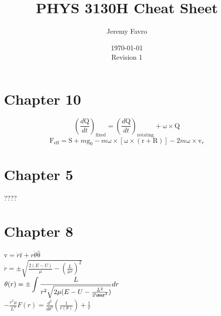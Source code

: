 \documentclass[10pt,landscape,letterpaper]{cheatsheet}
\title{PHYS 3130H Cheat Sheet}
\author{Jeremy Favro}
\date{\today\\Revision 1}
\newcommand{\bv}[1]{\bm{\mathrm{#1}}}
\newcommand{\uv}[1]{\hat{\bv{{#1}}}}
\begin{document}
\maketitle

\section*{Chapter 10}
$$\left(\frac{d\bv{Q}}{dt}\right)_{\mathrm{fixed}}=\left(\frac{d\bv{Q}}{dt}\right)_{\mathrm{rotating}}+\bv{\omega}\times \bv{Q}$$
$$\bv{F}_{\mathrm{eff}}=\bv{S}+m\bv{g}_0-m\bv{\omega}\times\left[\bv{\omega}\times (\bv{r}+\bv{R})\right]-2m\bv{\omega}\times \bv{v}_r$$
\section*{Chapter 5}
???? 
\section*{Chapter 8}
$\bv{v}=\dot{r}\uv{r}+r\dot{\theta}\uv{\theta}$\\
$\dot{r}=\pm\sqrt{\frac{2(E-U)}{\mu}-\left(\frac{L}{\mu r}\right)^2}$\\
$\theta(r)=\pm \displaystyle \int \dfrac{L}{r^2\sqrt{2\mu(E-U-\frac{L^2}{2\mur^2})}}dr$\\
$-\frac{r^2\mu}{L^2}F(r)=\frac{d^2}{d \theta^2}(\frac{1}{r(\theta)})+\frac{1}{r}$
\end{document}

